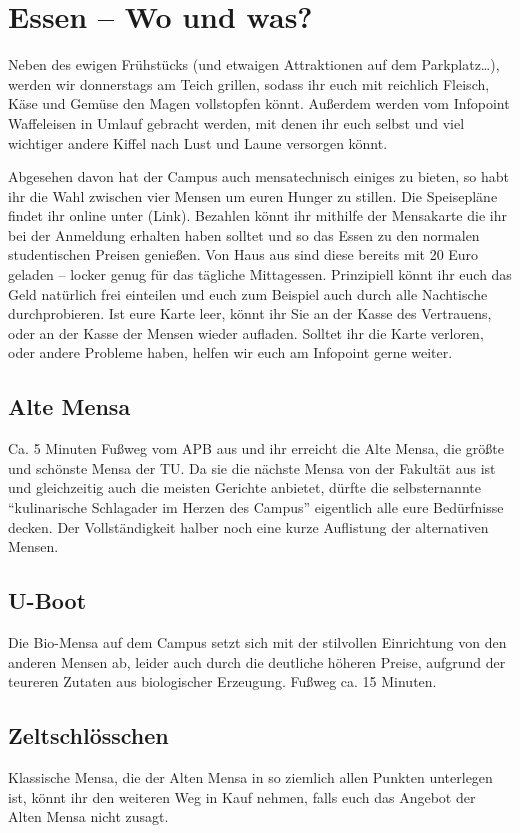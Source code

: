 \section*{Essen -- Wo und was?}
Neben des ewigen Frühstücks (und etwaigen Attraktionen auf dem Parkplatz…), werden wir donnerstags am Teich grillen, sodass ihr euch mit reichlich Fleisch, Käse und Gemüse den Magen vollstopfen könnt.
Außerdem werden vom Infopoint Waffeleisen in Umlauf gebracht werden, mit denen ihr euch selbst und viel wichtiger andere Kiffel nach Lust und Laune versorgen könnt.

Abgesehen davon hat der Campus auch mensatechnisch einiges zu bieten, so habt ihr die Wahl zwischen vier Mensen um euren Hunger zu stillen.
Die Speisepläne findet ihr online unter (Link).
Bezahlen könnt ihr mithilfe der Mensakarte die ihr bei der Anmeldung erhalten haben solltet und so das Essen zu den normalen studentischen Preisen genießen.
Von Haus aus sind diese bereits mit 20 Euro geladen -- locker genug für das tägliche Mittagessen.
Prinzipiell könnt ihr euch das Geld natürlich frei einteilen und euch zum Beispiel auch durch alle Nachtische durchprobieren.
Ist eure Karte leer, könnt ihr Sie an der Kasse des Vertrauens, oder an der Kasse der Mensen wieder aufladen.
Solltet ihr die Karte verloren, oder andere Probleme haben, helfen wir euch am Infopoint gerne weiter.

\subsection*{Alte Mensa}
Ca. 5 Minuten Fußweg vom APB aus und ihr erreicht die Alte Mensa, die größte und schönste Mensa der TU\@.
Da sie die nächste Mensa von der Fakultät aus ist und gleichzeitig auch die meisten Gerichte anbietet, dürfte die selbsternannte \enquote{kulinarische Schlagader im Herzen des Campus} eigentlich alle eure Bedürfnisse decken.
Der Vollständigkeit halber noch eine kurze Auflistung der alternativen Mensen.

\subsection*{U-Boot}
Die Bio-Mensa auf dem Campus setzt sich mit der stilvollen Einrichtung von den anderen Mensen ab, leider auch durch die deutliche höheren Preise, aufgrund der teureren Zutaten aus biologischer Erzeugung.
Fußweg ca. 15 Minuten.

\subsection*{Zeltschlösschen}
Klassische Mensa, die der Alten Mensa in so ziemlich allen Punkten unterlegen ist, könnt ihr den weiteren Weg in Kauf nehmen, falls euch das Angebot der Alten Mensa nicht zusagt.

